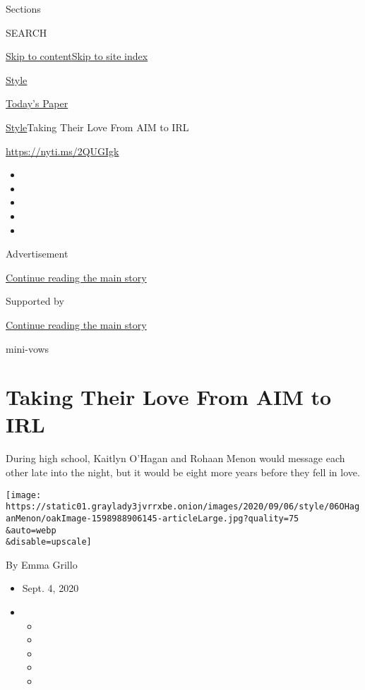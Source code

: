 Sections

SEARCH

\protect\hyperlink{site-content}{Skip to
content}\protect\hyperlink{site-index}{Skip to site index}

\href{https://www.nytimes3xbfgragh.onion/section/style}{Style}

\href{https://myaccount.nytimes3xbfgragh.onion/auth/login?response_type=cookie\&client_id=vi}{}

\href{https://www.nytimes3xbfgragh.onion/section/todayspaper}{Today's
Paper}

\href{/section/style}{Style}\textbar{}Taking Their Love From AIM to IRL

\url{https://nyti.ms/2QUGIgk}

\begin{itemize}
\item
\item
\item
\item
\item
\end{itemize}

Advertisement

\protect\hyperlink{after-top}{Continue reading the main story}

Supported by

\protect\hyperlink{after-sponsor}{Continue reading the main story}

mini-vows

\hypertarget{taking-their-love-from-aim-to-irl}{%
\section{Taking Their Love From AIM to
IRL}\label{taking-their-love-from-aim-to-irl}}

During high school, Kaitlyn O'Hagan and Rohaan Menon would message each
other late into the night, but it would be eight more years before they
fell in love.

\texttt{[image: https://static01.graylady3jvrrxbe.onion/images/2020/09/06/style/06OHaganMenon/oakImage-1598988906145-articleLarge.jpg?quality=75\\\&auto=webp\\\&disable=upscale]}

By Emma Grillo

\begin{itemize}
\item
  Sept. 4, 2020
\item
  \begin{itemize}
  \item
  \item
  \item
  \item
  \item
  \end{itemize}
\end{itemize}

